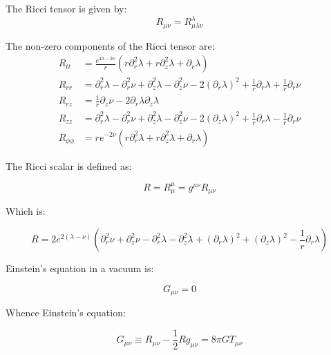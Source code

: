 \documentclass{article}
\begin{document}
The Ricci tensor is given by:
\begin{equation}
R_{\mu\nu}=R_{\mu\lambda\nu}^{\lambda}
\end{equation}

The non-zero components of the Ricci tensor are:
\begin{equation}
\begin{aligned}
R_{tt}&=\frac{e^{4\lambda-2\nu}}{r}\left(r\partial^{2}_{r}\lambda+r\partial^{2}_{z}\lambda+\partial_{r}\lambda\right)\\
R_{rr}&=\partial^{2}_{r}\lambda-\partial^{2}_{r}\nu+\partial^{2}_{z}\lambda-\partial^{2}_{z}\nu-2\left(\partial_{r}\lambda\right)^{2}+\frac{1}{r}\partial_{r}\lambda+\frac{1}{r}\partial_{r}\nu\\
R_{rz}&=\frac{1}{r}\partial_{z}\nu-2\partial_{r}\lambda\partial_{z}\lambda\\
R_{zz}&=\partial^{2}_{r}\lambda-\partial^{2}_{r}\nu+\partial^{2}_{z}\lambda-\partial^{2}_{z}\nu-2\left(\partial_{z}\lambda\right)^{2}+\frac{1}{r}\partial_{r}\lambda-\frac{1}{r}\partial_{r}\nu\\
R_{\phi\phi}&=re^{-2\nu}\left(r\partial^{2}_{r}\lambda+r\partial^{2}_{z}\lambda+\partial_{r}\lambda\right)
\end{aligned}
\label{eq:ricci-tensor-components}
\end{equation}

The Ricci scalar is defined as:

\begin{equation}
R=R_{\mu}^{\mu}=g^{\mu\nu}R_{\mu\nu}
\end{equation}

Which is:

\begin{equation}
R=2e^{2\left(\lambda-\nu\right)}\left(\partial^{2}_{r}\nu+\partial^{2}_{z}\nu-\partial^{2}_{r}\lambda-\partial^{2}_{z}\lambda+\left(\partial_{r}\lambda\right)^{2}+\left(\partial_{z}\lambda\right)^{2}-\frac{1}{r}\partial_{r}\lambda\right)\label{eq:R}
\end{equation}

Einstein's equation in a vacuum is:

\begin{equation}
\label{eq:einstein-vacuum-equation}
G_{\mu\nu}=0
\end{equation}

Whence Einstein's equation:

\begin{equation}
G_{\mu\nu}\equiv R_{\mu\nu}-\frac{1}{2}Rg_{\mu\nu}=8\pi GT_{\mu\nu}
\label{eq:einstein}
\end{equation}
\end{document}
